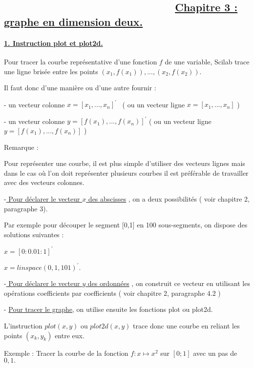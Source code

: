 \documentclass{article}
\begin{document}
\subsection{ \ \ \ \ \ \ \ \ \ \ \ \ \ \ \ \ \ \ \ \ \ \ \ \ \ \ \ \ \ 
\protect\underline{Chapitre 3 : graphe en dimension deux.}}

\paragraph{\protect\underline{1. Instruction plot et plot2d.}}

Pour tracer la courbe repr\'{e}sentative d'une fonction $f$ de une variable,
Scilab trace une ligne bris\'{e}e entre les points $%
(x_{1},f(x_{1})),...,(x_{2},f(x_{2})).$

Il faut donc d'une mani\`{e}re ou d'une autre fournir :

- un vecteur colonne $x=[x_{1},...,x_{n}]^{\prime }$ \ ( ou un vecteur ligne 
$x=[x_{1},...,x_{n}]$ )

- un vecteur colonne $y=[f(x_{1}),...,f(x_{n})]^{\prime }$ ( ou un vecteur
ligne $y=[f(x_{1}),...,f(x_{n})]$ )

Remarque :

Pour repr\'{e}senter une courbe, il est plus simple d'utiliser des vecteurs
lignes mais dans le cas o\`{u} l'on doit repr\'{e}senter plusieurs courbes
il est pr\'{e}f\'{e}rable de travailler avec des vecteurs colonnes.

-\underline{ Pour d\'{e}clarer le vecteur $x$ des abscisses} , on a deux
possibilit\'{e}s ( voir chapitre 2, paragraphe 3).

Par exemple pour d\'{e}couper le segment [0,1] en 100 sous-segments, on
dispose des solutions suivantes :

$x=[0:0.01:1]^{\prime }$

$x=linspace(0,1,101)^{\prime }.$

-\underline{ Pour d\'{e}clarer le vecteur $y$ des ordonn\'{e}es} , on
construit ce vecteur en utilisant les op\'{e}rations coefficients par
coefficients ( voir chapitre 2, paragraphe 4.2 )

- \underline{Pour tracer le graphe}, on utilise ensuite les fonctions plot
ou plot2d.

L'instruction $plot(x,y)$ ou $plot2d(x,y)$ trace donc une courbe en reliant
les points $(x_{k},y_{k})$ entre eux.

Exemple : Tracer la courbe de la fonction $f:x\mapsto x^{2}$ sur $\left[ 0;1%
\right] $ avec un pas de $0,1.$
\end{document}
